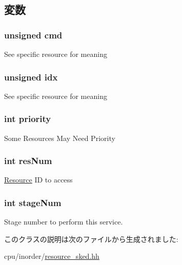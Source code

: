 \subsection{変数}
\hypertarget{classScheduleEntry_ab3d2004723874364229cf4339bb129fb}{
\subsubsection[{cmd}]{\setlength{\rightskip}{0pt plus 5cm}unsigned {\bf cmd}}}
\label{classScheduleEntry_ab3d2004723874364229cf4339bb129fb}
See specific resource for meaning \hypertarget{classScheduleEntry_aef726673a09d801a40682410390442cf}{
\subsubsection[{idx}]{\setlength{\rightskip}{0pt plus 5cm}unsigned {\bf idx}}}
\label{classScheduleEntry_aef726673a09d801a40682410390442cf}
See specific resource for meaning \hypertarget{classScheduleEntry_acec9ce2df15222151ad66fcb1d74eb9f}{
\subsubsection[{priority}]{\setlength{\rightskip}{0pt plus 5cm}int {\bf priority}}}
\label{classScheduleEntry_acec9ce2df15222151ad66fcb1d74eb9f}
Some Resources May Need Priority \hypertarget{classScheduleEntry_a4c6490c35efbfff10461ec4e6d0b0717}{
\subsubsection[{resNum}]{\setlength{\rightskip}{0pt plus 5cm}int {\bf resNum}}}
\label{classScheduleEntry_a4c6490c35efbfff10461ec4e6d0b0717}
\hyperlink{classResource}{Resource} ID to access \hypertarget{classScheduleEntry_a9da7aa2f94c428eaed5adad96a6ab151}{
\subsubsection[{stageNum}]{\setlength{\rightskip}{0pt plus 5cm}int {\bf stageNum}}}
\label{classScheduleEntry_a9da7aa2f94c428eaed5adad96a6ab151}
Stage number to perform this service. 

このクラスの説明は次のファイルから生成されました:\begin{DoxyCompactItemize}
\item 
cpu/inorder/\hyperlink{resource__sked_8hh}{resource\_\-sked.hh}\end{DoxyCompactItemize}
